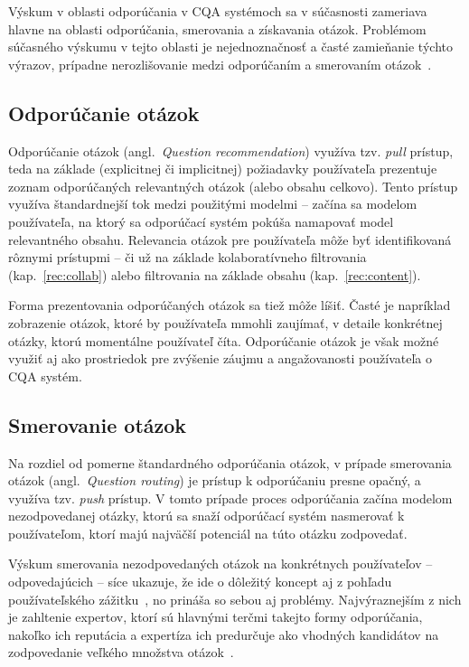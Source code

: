 Výskum v oblasti odporúčania v CQA systémoch sa v súčasnosti zameriava hlavne na oblasti odporúčania, smerovania
a získavania otázok. Problémom súčasného výskumu v tejto oblasti je nejednoznačnosť a časté zamieňanie týchto výrazov,
prípadne nerozlišovanie medzi odporúčaním a smerovaním otázok~\cite{Srba2016}.

\subsection{Odporúčanie otázok}

Odporúčanie otázok (angl.~\emph{Question recommendation}) využíva tzv. \emph{pull} prístup, teda na základe (explicitnej
či implicitnej) požiadavky používateľa prezentuje zoznam odporúčaných relevantných otázok (alebo obsahu celkovo).
Tento prístup využíva štandardnejší tok medzi použitými modelmi -- začína sa modelom používateľa, na ktorý sa odporúčací
systém pokúša namapovať model relevantného obsahu.
Relevancia otázok pre používateľa môže byť identifikovaná rôznymi prístupmi -- či už na základe kolaboratívneho
filtrovania (kap.~\ref{rec:collab}) alebo filtrovania na základe obsahu (kap.~\ref{rec:content}).

Forma prezentovania odporúčaných otázok sa tiež môže líšiť. Časté je napríklad zobrazenie otázok, ktoré by používateľa
mmohli zaujímať, v detaile konkrétnej otázky, ktorú momentálne používateľ číta. Odporúčanie otázok je však možné využiť
aj ako prostriedok pre zvýšenie záujmu a angažovanosti používateľa o CQA systém.


\subsection{Smerovanie otázok}

Na rozdiel od pomerne štandardného odporúčania otázok, v prípade smerovania otázok (angl.~\emph{Question routing})
je prístup k odporúčaniu presne opačný, a využíva tzv. \emph{push} prístup. V tomto prípade proces odporúčania začína
modelom nezodpovedanej otázky, ktorú sa snaží odporúčací systém nasmerovať k používateľom, ktorí majú najväčší potenciál
na túto otázku zodpovedať.

Výskum smerovania nezodpovedaných otázok na konkrétnych používateľov -- odpovedajúcich -- síce ukazuje, že ide o dôležitý
koncept aj z pohľadu používateľského zážitku~\cite{Li2010,Li2011}, no prináša so sebou aj problémy. Najvýraznejším z nich je zahltenie
expertov, ktorí sú hlavnými terčmi takejto formy odporúčania, nakoľko ich reputácia a expertíza ich predurčuje ako vhodných
kandidátov na zodpovedanie veľkého množstva otázok~\cite{Pal2015}.


